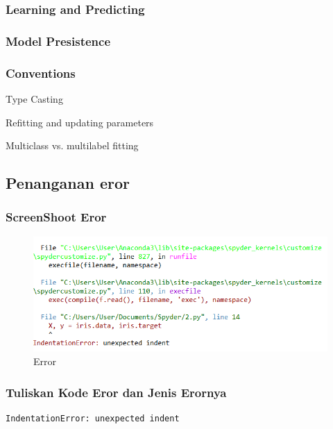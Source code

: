 \subsubsection{Learning and Predicting}



\subsubsection{Model Presistence}



\subsubsection{Conventions}
Type Casting

Refitting and updating parameters

Multiclass vs. multilabel fitting



\subsection{Penanganan eror}
\subsubsection{ScreenShoot Eror}
\begin{figure}[ht]
\centering
\includegraphics[scale=0.5]{figures/1174050/chapter1/error.png}
\caption{Error}
\label{contoh}
\end{figure}

\subsubsection{Tuliskan Kode Eror dan Jenis Erornya}
\begin{verbatim}
IndentationError: unexpected indent
\end{verbatim}


